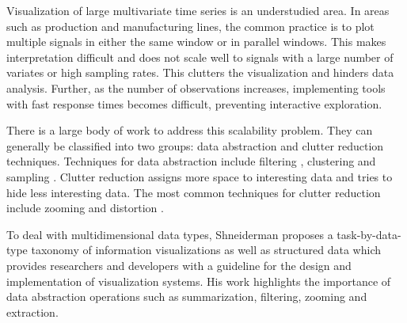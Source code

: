 
Visualization of large multivariate time series is an understudied area. In areas such as production and manufacturing lines, the common practice is to plot multiple signals in either the same window or in parallel windows. This makes interpretation difficult and does not scale well to signals with a large number of variates or high sampling rates. %
This clutters the visualization and hinders data analysis. Further, as the number of observations increases, implementing tools with fast response times becomes difficult, preventing interactive exploration.

There is a large body of work to address this scalability problem.
They can generally be classified into two groups: data abstraction and clutter reduction 
techniques. Techniques for data abstraction include filtering \cite{conf/chi/AhlbergS94b}, clustering
and sampling \cite{553159}. Clutter reduction assigns more space to interesting data and tries to hide less interesting data.
The most common techniques for clutter reduction include zooming and distortion \cite{559215,1382895,1196005}.
%
%

To deal with multidimensional data types, Shneiderman \cite{545307} proposes a task-by-data-type taxonomy of information visualizations as well as structured data which provides researchers and developers with a guideline for
the design and implementation of visualization systems. His work highlights the importance of data
abstraction operations such as summarization, filtering, zooming and extraction.
%


